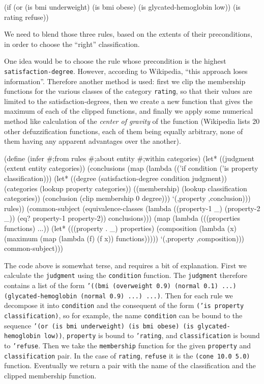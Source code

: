 \begin{Snippet}
(if (or (is bmi underweight) (is bmi obese)
        (is glycated-hemoglobin low))
    (is rating refuse))
\end{Snippet}


We need to blend those three rules, based on the extents
of their preconditions, in order to choose the ``right''
classification.

One idea would be to choose the rule whose precondition
is the highest \texttt{satisfaction-degree}. However, according
to Wikipedia, ``this approach loses information''. Therefore
another method is used: first we clip the membership functions
for the various classes of the category \texttt{rating}, so that
their values are limited to the satisfaction-degrees, then
we create a new function that gives the maximum of each of the
clipped functions, and finally we apply some numerical method
like calculation of the \textit{center of gravity} of the function
(Wikipedia lists 20 other defuzzification functions, each of them being
equally arbitrary, none of them having any apparent advantages
over the another).

\begin{Snippet}
(define (infer #;from rules #;about entity #;within categories)
  (let* ((judgment (extent entity categories)) 
	 (conclusions 
          (map
           (lambda (('if condition ('is property classification)))
             (let* ((degree (satisfaction-degree condition judgment))
                    (categories (lookup property categories))
                    ((membership) (lookup classification categories))
                    (conclusion (clip membership 0 degree)))
               `(,property ,conclusion)))
           rules))
	 (common-subject (equivalence-classes 
			  (lambda ((property-1 _) (property-2 _))
			    (eq? property-1 property-2))
			  conclusions)))
    (map (lambda (((properties functions) ...))
	   (let* (((property . _) properties)
		  (composition (lambda (x)
		 		 (maximum (map (lambda (f) 
                                                 (f x))
                                               functions)))))
	     `(,property ,composition)))
	 common-subject)))
\end{Snippet}

The code above is somewhat terse, and requires a bit of explanation.
First we calculate the \texttt{judgment} using the \texttt{condition}
function. The \texttt{judgment} therefore contains a list of the
form \texttt{'((bmi (overweight 0.9) (normal 0.1) ...)
(glycated-hemoglobin (normal 0.9) ...) ...)}. Then for each rule
we decompose it into \texttt{condition} and the consequent of the form
\texttt{('is property classification)}, so for example, the name
\texttt{condition} can be bound to the sequence 
\texttt{'(or (is bmi underweight) (is bmi obese) 
(is glycated-hemoglobin low))},  \texttt{property} is bound to 
\texttt{'rating}, and \texttt{classification} is bound to 
\texttt{'refuse}. Then we take the \texttt{membership} function
for the given \texttt{property} and \texttt{classification} pair.
In the case of \texttt{rating}, \texttt{refuse} it is the 
\texttt{(cone 10.0 5.0)} function. Eventually we return a pair with
the name of the classification and the clipped membership function.


